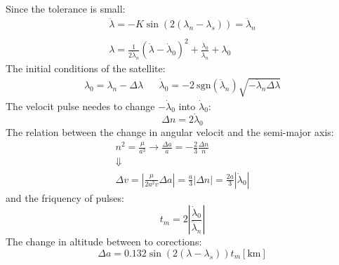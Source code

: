 \documentclass[12pt, a4paper]{article}
\begin{document}
Since the tolerance is small:
\begin{equation}
    \begin{array}{c}
        \ddot{\lambda}=-K\sin\left(2\left(\lambda_n-\lambda_s\right)\right)=\ddot{\lambda}_n \\\\
        \lambda=\displaystyle\frac{1}{2\ddot{\lambda}_n}\left(\dot{\lambda}-\dot{\lambda}_0\right)^2+\frac{\dot{\lambda}_0}{\ddot{\lambda}_n}+\lambda_0
    \end{array}
\end{equation}
The initial conditions of the satellite:
\begin{equation}
    \begin{matrix}
        \lambda_0=\lambda_n-\Delta\lambda && \dot{\lambda}_0=-2\mathrm{\ sgn}\left(\ddot{\lambda}_n\right)\sqrt{-\ddot{\lambda}_n\Delta\lambda}
    \end{matrix}
\end{equation}
The velocit pulse needes to change $-\dot{\lambda}_0$ into $\dot{\lambda}_0$:
\begin{equation}
    \Delta n=2\dot{\lambda}_0
\end{equation}
The relation between the change in angular velocit and the semi-major axis:
\begin{equation}
    \begin{array}{c}
        \displaystyle n^2=\frac{\mu}{a^3}\rightarrow\frac{\Delta a}{a}=-\frac{2}{3}\frac{\Delta n}{n} \\
        \Downarrow \\
        \displaystyle \Delta v=\left|\frac{\mu}{2a^2v}\Delta a\right|=\frac{a}{3}\left|\Delta n\right|=\frac{2a}{3}\left|\dot{\lambda}_0\right|
    \end{array}
\end{equation}
and the friquency of pulses:
\begin{equation}
    t_m=2\left|\frac{\dot{\lambda}_0}{\ddot{\lambda}_n}\right|
\end{equation}
The change in altitude between to corections:
\begin{equation}
    \Delta a=0.132\sin\left(2\left(\lambda-\lambda_s\right)\right)t_m\left[\mathrm{km}\right]
\end{equation}

\end{document}
